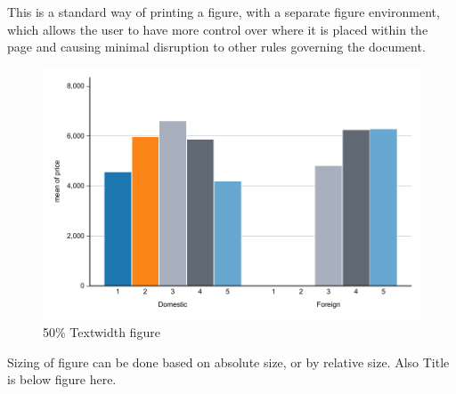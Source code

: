 \documentclass{article}%
\begin{document}
This is a standard way of printing a figure, with a separate figure environment, which allows the user to have more control over where it is placed within the page and causing minimal disruption to other rules governing the document. 
\newpage


\begin{figure}[ht]
        \includegraphics[width=.5\textwidth]{figure1.pdf}%
        \caption{50\% Textwidth figure}
        \label{fig:relative}
\end{figure}

Sizing of figure can be done based on absolute size, or by relative size. Also Title is below figure here.
\end{document}

